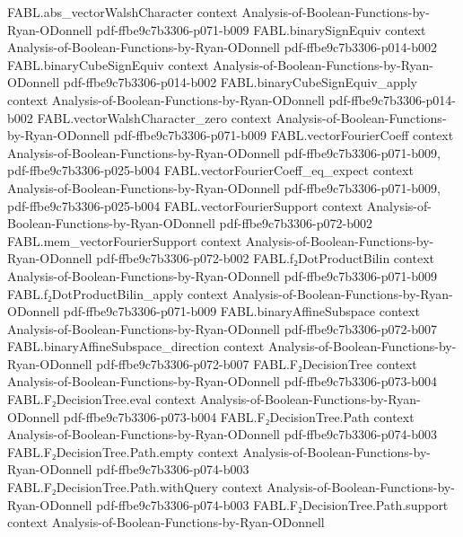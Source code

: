 \begin{theorem}
\proofstep
  {FABL.abs_vectorWalshCharacter}
  {context}
  {Analysis-of-Boolean-Functions-by-Ryan-ODonnell}
  {pdf-ffbe9c7b3306-p071-b009}
\proofstep
  {FABL.binarySignEquiv}
  {context}
  {Analysis-of-Boolean-Functions-by-Ryan-ODonnell}
  {pdf-ffbe9c7b3306-p014-b002}
\proofstep
  {FABL.binaryCubeSignEquiv}
  {context}
  {Analysis-of-Boolean-Functions-by-Ryan-ODonnell}
  {pdf-ffbe9c7b3306-p014-b002}
\proofstep
  {FABL.binaryCubeSignEquiv_apply}
  {context}
  {Analysis-of-Boolean-Functions-by-Ryan-ODonnell}
  {pdf-ffbe9c7b3306-p014-b002}
\proofstep
  {FABL.vectorWalshCharacter_zero}
  {context}
  {Analysis-of-Boolean-Functions-by-Ryan-ODonnell}
  {pdf-ffbe9c7b3306-p071-b009}
\proofstep
  {FABL.vectorFourierCoeff}
  {context}
  {Analysis-of-Boolean-Functions-by-Ryan-ODonnell}
  {pdf-ffbe9c7b3306-p071-b009,
    pdf-ffbe9c7b3306-p025-b004}
\proofstep
  {FABL.vectorFourierCoeff_eq_expect}
  {context}
  {Analysis-of-Boolean-Functions-by-Ryan-ODonnell}
  {pdf-ffbe9c7b3306-p071-b009,
    pdf-ffbe9c7b3306-p025-b004}
\proofstep
  {FABL.vectorFourierSupport}
  {context}
  {Analysis-of-Boolean-Functions-by-Ryan-ODonnell}
  {pdf-ffbe9c7b3306-p072-b002}
\proofstep
  {FABL.mem_vectorFourierSupport}
  {context}
  {Analysis-of-Boolean-Functions-by-Ryan-ODonnell}
  {pdf-ffbe9c7b3306-p072-b002}
\proofstep
  {FABL.f₂DotProductBilin}
  {context}
  {Analysis-of-Boolean-Functions-by-Ryan-ODonnell}
  {pdf-ffbe9c7b3306-p071-b009}
\proofstep
  {FABL.f₂DotProductBilin_apply}
  {context}
  {Analysis-of-Boolean-Functions-by-Ryan-ODonnell}
  {pdf-ffbe9c7b3306-p071-b009}
\proofstep
  {FABL.binaryAffineSubspace}
  {context}
  {Analysis-of-Boolean-Functions-by-Ryan-ODonnell}
  {pdf-ffbe9c7b3306-p072-b007}
\proofstep
  {FABL.binaryAffineSubspace_direction}
  {context}
  {Analysis-of-Boolean-Functions-by-Ryan-ODonnell}
  {pdf-ffbe9c7b3306-p072-b007}
\proofstep
  {FABL.F₂DecisionTree}
  {context}
  {Analysis-of-Boolean-Functions-by-Ryan-ODonnell}
  {pdf-ffbe9c7b3306-p073-b004}
\proofstep
  {FABL.F₂DecisionTree.eval}
  {context}
  {Analysis-of-Boolean-Functions-by-Ryan-ODonnell}
  {pdf-ffbe9c7b3306-p073-b004}
\proofstep
  {FABL.F₂DecisionTree.Path}
  {context}
  {Analysis-of-Boolean-Functions-by-Ryan-ODonnell}
  {pdf-ffbe9c7b3306-p074-b003}
\proofstep
  {FABL.F₂DecisionTree.Path.empty}
  {context}
  {Analysis-of-Boolean-Functions-by-Ryan-ODonnell}
  {pdf-ffbe9c7b3306-p074-b003}
\proofstep
  {FABL.F₂DecisionTree.Path.withQuery}
  {context}
  {Analysis-of-Boolean-Functions-by-Ryan-ODonnell}
  {pdf-ffbe9c7b3306-p074-b003}
\proofstep
  {FABL.F₂DecisionTree.Path.support}
  {context}
  {Analysis-of-Boolean-Functions-by-Ryan-ODonnell}

\end{theorem}
